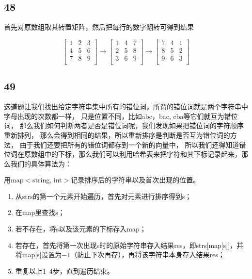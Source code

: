 \documentclass[12pt,a4paper]{article}
\begin{document}
\subsection{48}
\begin{CJK}{UTF8}{gbsn}
首先对原数组取其转置矩阵，然后把每行的数字翻转可得到结果
\end{CJK}
\[
  \begin{bmatrix}
    1 & 2 & 3  \\
    4 & 5 & 6  \\
	7 & 8 & 9  \\
  \end{bmatrix}
  \rightarrow
  \begin{bmatrix}
    1 & 4 & 7  \\
    2 & 5 & 8  \\
	3 & 6 & 9  \\
  \end{bmatrix}
  \rightarrow
  \begin{bmatrix}
    7 & 4 & 1  \\
    8 & 5 & 2  \\
	9 & 6 & 3  \\
  \end{bmatrix}
\]

\subsection{49}
\begin{CJK}{UTF8}{gbsn}
这道题让我们找出给定字符串集中所有的错位词，所谓的错位词就是两个字符串中字母出现的次数都一样，
只是位置不同，比如abc，bac, cba等它们就互为错位词，
那么我们如何判断两者是否是错位词呢，我们发现如果把错位词的字符顺序重新排列，
那么会得到相同的结果，所以重新排序是判断是否互为错位词的方法，
由于我们还要把所有的错位词都存到一个新的向量中，
所以我们还得知道错位词在原数组中的下标，那么我们可以利用哈希表来把字符和其下标记录起来，那么我们的具体算法为：
\par
用map$<$string, int$>$记录排序后的字符串以及首次出现的位置。
\begin{enumerate}
\item 从strs的第一个元素开始遍历，首先对元素进行排序得到s；
\item 在map里查找s；
\item 若不存在，将s以及该元素的下标存入map；
\item 若存在，首先将第一次出现s时的原始字符串存入结果res，即strs[map[s]]，并将map[s]设置为$-1$（防止下次再存），再将该字符串本身存入结果res；
\item 重复以上1--4步，直到遍历结束。
\end{enumerate}
\end{CJK}
\end{document}
